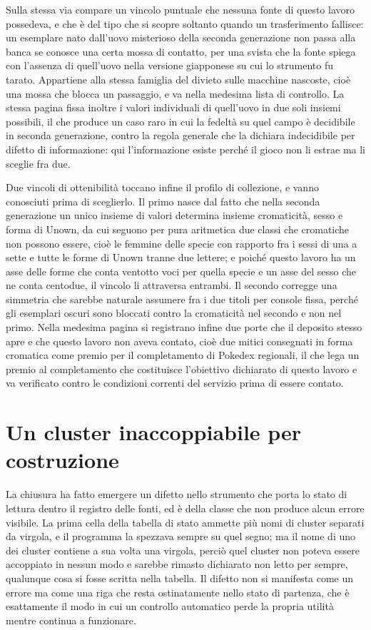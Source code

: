 Sulla stessa via compare un vincolo puntuale che nessuna fonte di questo lavoro possedeva, e che è del tipo che si scopre soltanto quando un trasferimento fallisce: un esemplare nato dall'uovo misterioso della seconda generazione non passa alla banca se conosce una certa mossa di contatto, per una svista che la fonte spiega con l'assenza di quell'uovo nella versione giapponese su cui lo strumento fu tarato. Appartiene alla stessa famiglia del divieto sulle macchine nascoste, cioè una mossa che blocca un passaggio, e va nella medesima lista di controllo. La stessa pagina fissa inoltre i valori individuali di quell'uovo in due soli insiemi possibili, il che produce un caso raro in cui la fedeltà su quel campo è decidibile in seconda generazione, contro la regola generale che la dichiara indecidibile per difetto di informazione: qui l'informazione esiste perché il gioco non li estrae ma li sceglie fra due.

Due vincoli di ottenibilità toccano infine il profilo di collezione, e vanno conosciuti prima di sceglierlo. Il primo nasce dal fatto che nella seconda generazione un unico insieme di valori determina insieme cromaticità, sesso e forma di Unown, da cui seguono per pura aritmetica due classi che cromatiche non possono essere, cioè le femmine delle specie con rapporto fra i sessi di una a sette e tutte le forme di Unown tranne due lettere; e poiché questo lavoro ha un asse delle forme che conta ventotto voci per quella specie e un asse del sesso che ne conta centodue, il vincolo li attraversa entrambi. Il secondo corregge una simmetria che sarebbe naturale assumere fra i due titoli per console fissa, perché gli esemplari oscuri sono bloccati contro la cromaticità nel secondo e non nel primo. Nella medesima pagina si registrano infine due porte che il deposito stesso apre e che questo lavoro non aveva contato, cioè due mitici consegnati in forma cromatica come premio per il completamento di Pokedex regionali, il che lega un premio al completamento che costituisce l'obiettivo dichiarato di questo lavoro e va verificato contro le condizioni correnti del servizio prima di essere contato.

\section{Un cluster inaccoppiabile per costruzione}

La chiusura ha fatto emergere un difetto nello strumento che porta lo stato di lettura dentro il registro delle fonti, ed è della classe che non produce alcun errore visibile. La prima cella della tabella di stato ammette più nomi di cluster separati da virgola, e il programma la spezzava sempre su quel segno; ma il nome di uno dei cluster contiene a sua volta una virgola, perciò quel cluster non poteva essere accoppiato in nessun modo e sarebbe rimasto dichiarato non letto per sempre, qualunque cosa si fosse scritta nella tabella. Il difetto non si manifesta come un errore ma come una riga che resta ostinatamente nello stato di partenza, che è esattamente il modo in cui un controllo automatico perde la propria utilità mentre continua a funzionare.

